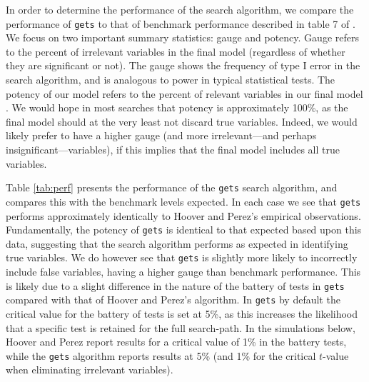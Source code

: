 \documentclass[bib]{statapress}
\begin{document}
In order to determine the performance of the search algorithm, we compare the 
performance of \texttt{gets} to that of benchmark performance described in 
table 7 of \citet{HooverPerez1999}.  We focus on two important summary 
statistics: gauge and potency.  Gauge refers to the percent of irrelevant 
variables in the final model (regardless of whether they are significant or 
not).  The gauge shows the frequency of type I error in the search algorithm, 
and is analogous to power in typical statistical tests.  The potency of our 
model refers to the percent of relevant variables in our final model 
\citep{Castleetal2012}.  We would hope in most searches that potency is 
approximately 100\%, as the final model should at the very least not discard 
true variables.  Indeed, we would likely prefer to have a higher gauge (and 
more irrelevant---and perhaps insignificant---variables), if this implies 
that the final model includes all true variables.

Table \ref{tab:perf} presents the performance of the \texttt{gets} search 
algorithm, and compares this with the benchmark levels expected.  In each case 
we see that \texttt{gets} performs approximately identically to Hoover and
Perez's empirical observations.  Fundamentally, the potency of \texttt{gets} is
identical to that expected based upon this data, suggesting that the search 
algorithm performs as expected in identifying true variables.  We do however
see that \texttt{gets} is slightly more likely to incorrectly include false 
variables, having a higher gauge than benchmark performance.  This is likely 
due to a slight difference in the nature of the battery of tests in 
\texttt{gets} compared with that of Hoover and Perez's algorithm.  In 
\texttt{gets} by default the critical value for the battery of tests is set at
5\%, as this increases the likelihood that a specific test is retained for the 
full search-path.  In the simulations below, Hoover and Perez report results 
for a critical value of 1\% in the battery tests, while the \texttt{gets} 
algorithm reports results at 5\% (and 1\% for the critical $t$-value when 
eliminating irrelevant variables).

\cnp
\end{document}
